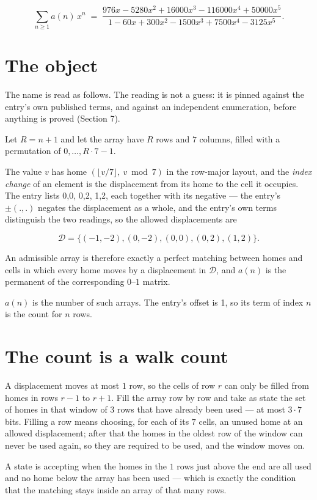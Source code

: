 \documentclass[11pt]{article}
\theoremstyle{definition}
\begin{document}
\[\sum_{n \ge 1} a(n)\,x^n \;=\; \frac{976x - 5280x^{2} + 16000x^{3} - 116000x^{4} + 50000x^{5}}{1 - 60x + 300x^{2} - 1500x^{3} + 7500x^{4} - 3125x^{5}}.\]

\section{The object}

The name is read as follows. The reading is not a guess: it is pinned against the entry's own published terms, and against an independent enumeration, before anything is proved (Section 7).

Let $R = n + 1$ and let the array have $R$ rows and $7$ columns, filled with a permutation of $0,\dots,R\cdot7-1$.

The value $v$ has home $(\lfloor v/7\rfloor,\ v \bmod 7)$ in the row-major layout, and the {\itshape index change} of an element is the displacement from its home to the cell it occupies. The entry lists 0,0, 0,2, 1,2, each together with its negative --- the entry's $\pm(.,.)$ negates the displacement as a whole, and the entry's own terms distinguish the two readings, so the allowed displacements are

\[\mathcal{D} = \{(-1,-2), (0,-2), (0,0), (0,2), (1,2)\}.\]

An admissible array is therefore exactly a perfect matching between homes and cells in which every home moves by a displacement in $\mathcal{D}$, and $a(n)$ is the permanent of the corresponding $0$--$1$ matrix.

$a(n)$ is the number of such arrays. The entry's offset is 1, so its term of index $n$ is the count for $n$ rows.

\section{The count is a walk count}

A displacement moves at most $1$ row, so the cells of row $r$ can only be filled from homes in rows $r-1$ to $r+1$. Fill the array row by row and take as state the set of homes in that window of $3$ rows that have already been used --- at most $3\cdot7$ bits. Filling a row means choosing, for each of its $7$ cells, an unused home at an allowed displacement; after that the homes in the oldest row of the window can never be used again, so they are required to be used, and the window moves on.

A state is accepting when the homes in the $1$ rows just above the end are all used and no home below the array has been used --- which is exactly the condition that the matching stays inside an array of that many rows.
\end{document}
